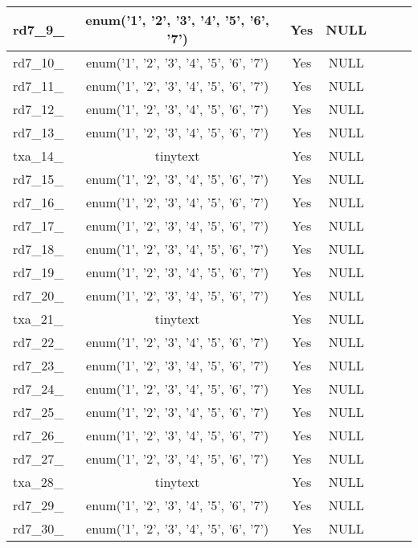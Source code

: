 \begin{longtable}{|l|c|c|c|l|l|l|}
rd7\_9\_ & enum('1', '2', '3', '4', '5', '6', '7') & Yes & NULL &  &  &  \\ \hline 
rd7\_10\_ & enum('1', '2', '3', '4', '5', '6', '7') & Yes & NULL &  &  &  \\ \hline 
rd7\_11\_ & enum('1', '2', '3', '4', '5', '6', '7') & Yes & NULL &  &  &  \\ \hline 
rd7\_12\_ & enum('1', '2', '3', '4', '5', '6', '7') & Yes & NULL &  &  &  \\ \hline 
rd7\_13\_ & enum('1', '2', '3', '4', '5', '6', '7') & Yes & NULL &  &  &  \\ \hline 
txa\_14\_ & tinytext & Yes & NULL &  &  &  \\ \hline 
rd7\_15\_ & enum('1', '2', '3', '4', '5', '6', '7') & Yes & NULL &  &  &  \\ \hline 
rd7\_16\_ & enum('1', '2', '3', '4', '5', '6', '7') & Yes & NULL &  &  &  \\ \hline 
rd7\_17\_ & enum('1', '2', '3', '4', '5', '6', '7') & Yes & NULL &  &  &  \\ \hline 
rd7\_18\_ & enum('1', '2', '3', '4', '5', '6', '7') & Yes & NULL &  &  &  \\ \hline 
rd7\_19\_ & enum('1', '2', '3', '4', '5', '6', '7') & Yes & NULL &  &  &  \\ \hline 
rd7\_20\_ & enum('1', '2', '3', '4', '5', '6', '7') & Yes & NULL &  &  &  \\ \hline 
txa\_21\_ & tinytext & Yes & NULL &  &  &  \\ \hline 
rd7\_22\_ & enum('1', '2', '3', '4', '5', '6', '7') & Yes & NULL &  &  &  \\ \hline 
rd7\_23\_ & enum('1', '2', '3', '4', '5', '6', '7') & Yes & NULL &  &  &  \\ \hline 
rd7\_24\_ & enum('1', '2', '3', '4', '5', '6', '7') & Yes & NULL &  &  &  \\ \hline 
rd7\_25\_ & enum('1', '2', '3', '4', '5', '6', '7') & Yes & NULL &  &  &  \\ \hline 
rd7\_26\_ & enum('1', '2', '3', '4', '5', '6', '7') & Yes & NULL &  &  &  \\ \hline 
rd7\_27\_ & enum('1', '2', '3', '4', '5', '6', '7') & Yes & NULL &  &  &  \\ \hline 
txa\_28\_ & tinytext & Yes & NULL &  &  &  \\ \hline 
rd7\_29\_ & enum('1', '2', '3', '4', '5', '6', '7') & Yes & NULL &  &  &  \\ \hline 
rd7\_30\_ & enum('1', '2', '3', '4', '5', '6', '7') & Yes & NULL &  &  &  \\ \hline 

\end{longtable}
